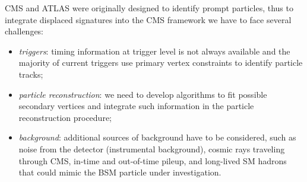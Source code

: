 CMS and ATLAS were 
originally designed to identify
prompt particles, thus to integrate displaced
signatures into the CMS framework we have to face
several challenges:
\begin{itemize}
\item \emph{triggers}: timing information at trigger level is not always
  available and the majority of current triggers use primary vertex
  constraints to identify particle 
  tracks;
\item \emph{particle reconstruction}:
  we need to develop
  algorithms to
  fit possible secondary vertices and integrate such information in the
  particle reconstruction procedure;
\item \emph{background}: additional sources of background have to be
  considered, such as noise %
  from the detector (instrumental
  background), cosmic rays traveling through CMS, in-time
  and out-of-time pileup, 
  and long-lived SM hadrons that could mimic the BSM particle under investigation.
\end{itemize}



